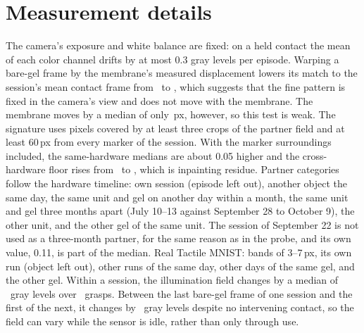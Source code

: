 \documentclass[10pt,twocolumn,letterpaper]{article}
\begin{document}
\section{Measurement details}
The camera's exposure and white balance are fixed: on a held contact the mean of each color channel drifts by at most 0.3 gray levels per episode. Warping a bare-gel frame by the membrane's measured displacement lowers its match to the session's mean contact frame from \BlankVsFieldFar\ to \WarpedBlankVsFieldFar, which suggests that the fine pattern is fixed in the camera's view and does not move with the membrane. The membrane moves by a median of only \WarpDispPx\,px, however, so this test is weak. The signature uses pixels covered by at least three crops of the partner field and at least 60\,px from every marker of the session. With the marker surroundings included, the same-hardware medians are about 0.05 higher and the cross-hardware floor rises from \HwFarOtherUnit\ to \HwOtherUnit, which is inpainting residue. Partner categories follow the hardware timeline: own session (episode left out), another object the same day, the same unit and gel on another day within a month, the same unit and gel three months apart (July 10--13 against September 28 to October 9), the other unit, and the other gel of the same unit. The session of September 22 is not used as a three-month partner, for the same reason as in the probe, and its own value, 0.11, is part of the median. Real Tactile MNIST: bands of 3--7\,px, its own run (object left out), other runs of the same day, other days of the same gel, and the other gel.
Within a session, the illumination field changes by a median of \DriftUse\ gray levels over \DriftUseContacts\ grasps. Between the last bare-gel frame of one session and the first of the next, it changes by \DriftIdle\ gray levels despite no intervening contact, so the field can vary while the sensor is idle, rather than only through use.
\end{document}
